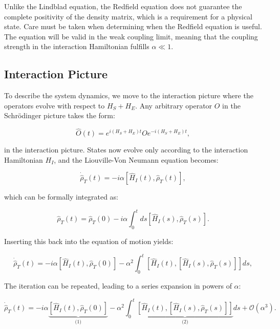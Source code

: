 Unlike the Lindblad equation, the Redfield equation does not guarantee the complete positivity of the density matrix, which is a requirement for a physical state. Care must be taken when determining when the Redfield equation is useful. The equation will be valid in the weak coupling limit, meaning that the coupling strength in the interaction Hamiltonian fulfills $\alpha \ll 1$.

\subsection{Interaction Picture}

To describe the system dynamics, we move to the interaction picture where the operators evolve with respect to $H_S + H_E$. Any arbitrary operator $O$ in the Schrödinger picture takes the form:

\begin{equation}
	\hat{O}(t) = e^{i(H_S+H_E)t} O e^{-i(H_S+H_E)t},
	\label{eq:Interaction_Picture_Operators}
\end{equation}

in the interaction picture. States now evolve only according to the interaction Hamiltonian $H_I$, and the Liouville-Von Neumann equation becomes:

\begin{equation}
	\dot{\hat{\rho}}_T(t) = -i \alpha [\hat{H}_I(t), \hat{\rho}_T(t)],
	\label{eq:LiouvilleVN}
\end{equation}

which can be formally integrated as:

\begin{equation}
	\hat{\rho}_T(t) = \hat{\rho}_T(0) - i \alpha \int_0^t ds [\hat{H}_I(s), \hat{\rho}_T(s)].
	\label{eq:Formal_Integration}
\end{equation}

Inserting this back into the equation of motion yields:

\begin{equation}
	\dot{\hat{\rho}}_T(t) = -i \alpha \left[ \hat{H}_I(t), \hat{\rho}_T(0) \right]
	- \alpha^2 \int_0^t \left[ \hat{H}_I(t), \left[ \hat{H}_I(s), \hat{\rho}_T(s) \right] \right] ds,
	\label{eq:Second_Order_Expansion}
\end{equation}

The iteration can be repeated, leading to a series expansion in powers of $\alpha$:

\begin{equation}
	\dot{\hat{\rho}}_T(t) = -i \alpha \underbrace{\left[ \hat{H}_I(t), \hat{\rho}_T(0) \right]}_{\text{(1)}}
	- \alpha^2 \int_0^t \underbrace{\left[ \hat{H}_I(t), \left[ \hat{H}_I(s), \hat{\rho}_T(s) \right] \right]}_{\text{(2)}} ds + \mathcal{O} (\alpha^3).
	\label{eq:Second_Order_Expansion_truncated}
\end{equation}

